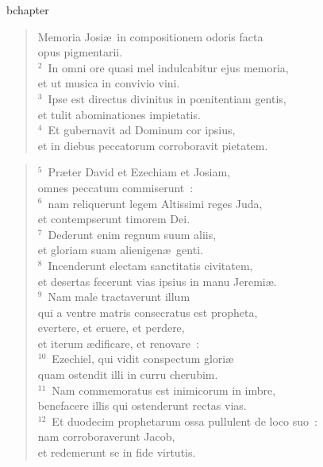 bchapter\begin{verse}\vspace{-19pt}Memoria Josi\ae\ in compositionem odoris facta\\ opus pigmentarii.\\
${}^{2}$~In omni ore quasi mel indulcabitur ejus memoria,\\ et ut musica in convivio vini.\\
${}^{3}$~Ipse est directus divinitus in pœnitentiam gentis,\\ et tulit abominationes impietatis.\\
${}^{4}$~Et gubernavit ad Dominum cor ipsius,\\ et in diebus peccatorum corroboravit pietatem.\end{verse}


\begin{verse}${}^{5}$~Pr\ae ter David et Ezechiam et Josiam,\\ omnes peccatum commiserunt~:\\
${}^{6}$~nam reliquerunt legem Altissimi reges Juda,\\ et contempserunt timorem Dei.\\
${}^{7}$~Dederunt enim regnum suum aliis,\\ et gloriam suam alienigen\ae\ genti.\\
${}^{8}$~Incenderunt electam sanctitatis civitatem,\\ et desertas fecerunt vias ipsius in manu Jeremi\ae .\\
${}^{9}$~Nam male tractaverunt illum\\ qui a ventre matris consecratus est propheta,\\ evertere, et eruere, et perdere,\\ et iterum \ae dificare, et renovare~:\\
${}^{10}$~Ezechiel, qui vidit conspectum glori\ae \\ quam ostendit illi in curru cherubim.\\
${}^{11}$~Nam commemoratus est inimicorum in imbre,\\ benefacere illis qui ostenderunt rectas vias.\\
${}^{12}$~Et duodecim prophetarum ossa pullulent de loco suo~:\\ nam corroboraverunt Jacob,\\ et redemerunt se in fide virtutis.\end{verse}


